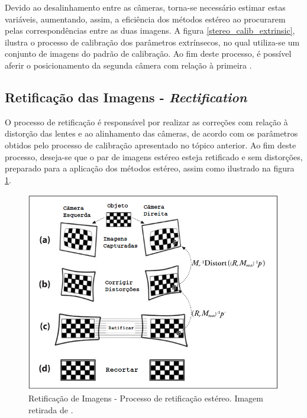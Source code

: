 Devido ao desalinhamento entre as câmeras, torna-se necessário estimar estas variáveis, aumentando, assim, a eficiência dos métodos estéreo ao procurarem pelas correspondências entre as duas imagens. A figura \ref{stereo_calib_extrinsic}, ilustra o processo de calibração dos parâmetros extrínsecos, no qual utiliza-se um conjunto de imagens do padrão de calibração. Ao fim deste processo, é possível aferir o posicionamento da segunda câmera com relação à primeira \cite{Bouguet1999}.


\subsection{Retificação das Imagens - \textit{Rectification}}

O processo de retificação é responsável por realizar as correções com relação à distorção das lentes e ao alinhamento das câmeras, de acordo com os parâmetros obtidos pelo processo de calibração apresentado no tópico anterior. Ao fim deste processo, deseja-se que o par de imagens estéreo esteja retificado e sem distorções, preparado para a aplicação dos métodos estéreo, assim como ilustrado na figura \ref{rectification_process}.

\begin{figure}[H]
 	\centering
 	\includegraphics[scale=0.32]{./Resources/bradski/rectification_process_ptbr.png}
 	\caption{Retificação de Imagens - Processo de retificação estéreo. Imagem retirada de \cite{Bradski2008}.}
 	\label{rectification_process}
\end{figure}



